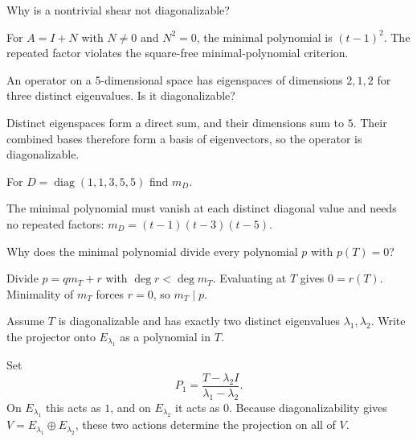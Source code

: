 \begin{problem}\label{prob:i11-problem-03}
Why is a nontrivial shear not diagonalizable?
\end{problem}
\begin{solution}
For $A=I+N$ with $N\ne0$ and $N^2=0$, the minimal polynomial is $(t-1)^2$. The repeated factor violates the square-free minimal-polynomial criterion.
\end{solution}

\begin{problem}\label{prob:i11-problem-04}
An operator on a 5-dimensional space has eigenspaces of dimensions $2,1,2$ for three distinct eigenvalues. Is it diagonalizable?
\end{problem}
\begin{solution}
Distinct eigenspaces form a direct sum, and their dimensions sum to $5$. Their combined bases therefore form a basis of eigenvectors, so the operator is diagonalizable.
\end{solution}

\begin{problem}\label{prob:i11-problem-05}
For $D=\operatorname{diag}(1,1,3,5,5)$ find $m_D$.
\end{problem}
\begin{solution}
The minimal polynomial must vanish at each distinct diagonal value and needs no repeated factors: $m_D=(t-1)(t-3)(t-5)$.
\end{solution}

\begin{problem}\label{prob:i11-problem-06}
Why does the minimal polynomial divide every polynomial $p$ with $p(T)=0$?
\end{problem}
\begin{solution}
Divide $p=qm_T+r$ with $\deg r<\deg m_T$. Evaluating at $T$ gives $0=r(T)$. Minimality of $m_T$ forces $r=0$, so $m_T\mid p$.
\end{solution}

\begin{problem}\label{prob:i11-problem-07}
Assume $T$ is diagonalizable and has exactly two distinct eigenvalues $\lambda_1,\lambda_2$. Write the projector onto $E_{\lambda_1}$ as a polynomial in $T$.
\end{problem}
\begin{solution}
Set
\[
P_1=\frac{T-\lambda_2I}{\lambda_1-\lambda_2}.
\]
On $E_{\lambda_1}$ this acts as $1$, and on $E_{\lambda_2}$ it acts as $0$.
Because diagonalizability gives $V=E_{\lambda_1}\oplus E_{\lambda_2}$, these two actions determine the projection on all of $V$.
\end{solution}

